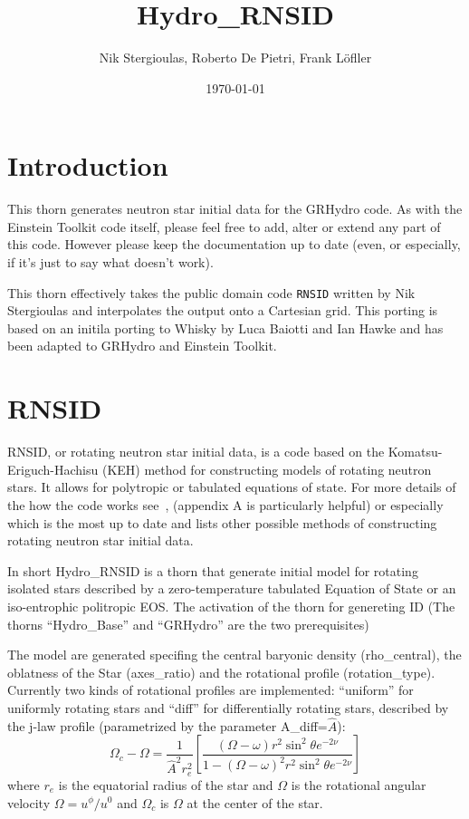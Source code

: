 \documentclass{article}
\begin{document}
\title{Hydro\_RNSID}
\author{Nik Stergioulas, Roberto De Pietri, Frank L\"ofller}
\date{\today}
\maketitle


\section{Introduction}
\label{sec:intro}

This thorn generates neutron star initial data for the GRHydro code. As
with the Einstein Toolkit code itself, please feel free to add, alter 
or extend any part of this code. However please keep the documentation up to
date (even, or especially, if it's just to say what doesn't work).

This thorn effectively takes the public domain code {\tt RNSID}
written by Nik Stergioulas and interpolates the output onto a
Cartesian grid. This porting is based on an initila porting to 
Whisky by Luca Baiotti and Ian Hawke and has been adapted to 
GRHydro and Einstein Toolkit.


\section{RNSID}
\label{sec:rnsid}

RNSID, or rotating neutron star initial data, is a code based on the
Komatsu-Eriguch-Hachisu (KEH) method for constructing models of
rotating neutron stars. It allows for polytropic or tabulated
equations of state. For more details of the how the code works
see~\cite{rnsid1}, \cite{nsthesis} (appendix A is particularly
helpful) or especially \cite{nslivrev} which is the most up to date
and lists other possible methods of constructing rotating neutron star
initial data.

In short Hydro\_RNSID is a thorn that generate initial model for rotating 
isolated stars described by a zero-temperature tabulated Equation of State or
an iso-entrophic politropic EOS. The activation of the thorn for
genereting ID (The thorns ``Hydro\_Base'' and  ``GRHydro'' are the two prerequisites)

The model are generated specifing the central baryonic density
(rho\_central), the oblatness of the Star (axes\_ratio) and the
rotational profile (rotation\_type).  Currently two kinds of
rotational profiles are implemented: ``uniform'' for uniformly
rotating stars and ``diff'' for differentially rotating stars,
described by the j-law profile (parametrized by the parameter
A\_diff=$\hat{A}$):
\begin{equation}
  \Omega_c-\Omega = \frac{1}{\hat{A}^2 r_e^2}
  \left[ \frac{(\Omega-\omega) r^2 \sin^2 \theta e^{-2\nu}}{1-(\Omega-\omega)^2 r^2 \sin^2 \theta e^{-2\nu}}\right]
\end{equation}
where $r_e$ is the equatorial radius of the star and $\Omega$ is the
rotational angular velocity $\Omega=u^\phi/u^0$ and $\Omega_c$ is
$\Omega$ at the center of the star.
\end{document}
